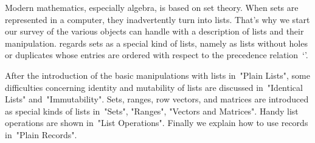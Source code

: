 


Modern mathematics, especially algebra, is based on set theory. When sets
are represented in a computer, they inadvertently turn into lists. That's
why we start our  survey of the various  objects {\GAP} can handle with a
description of  lists  and their  manipulation. {\GAP}  regards sets as a
special kind of lists, namely as lists without  holes or duplicates whose
entries are ordered with respect to the precedence relation~`\<'.

After  the introduction of  the basic  manipulations with lists in~"Plain
Lists", some difficulties concerning identity and mutability of lists are
discussed  in~"Identical Lists"  and~"Immutability".  Sets,  ranges, row
vectors, and matrices are introduced as special kinds of lists in~"Sets",
"Ranges", "Vectors and Matrices".   Handy list   operations are
shown in~"List Operations". Finally we explain how to use records
in~"Plain Records". 


